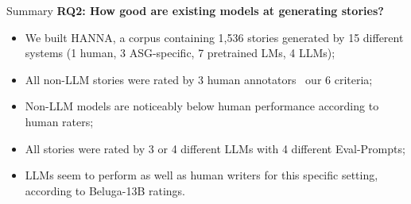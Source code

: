 \begin{frame}{Summary}
    \textbf{RQ2: How good are existing models at generating stories?}
    \begin{itemize}
        \item We built HANNA, a corpus containing 1,536 stories generated by 15 different systems (1 human, 3 ASG-specific, 7 pretrained LMs, 4 LLMs);
        \item All non-LLM stories were rated by 3 human annotators \wrt\ our 6 criteria;
        \item Non-LLM models are noticeably below human performance according to human raters;
        \item All stories were rated by 3 or 4 different LLMs with 4 different Eval-Prompts;
        \item LLMs seem to perform as well as human writers for this specific setting, according to Beluga-13B ratings.
    \end{itemize}
\end{frame}